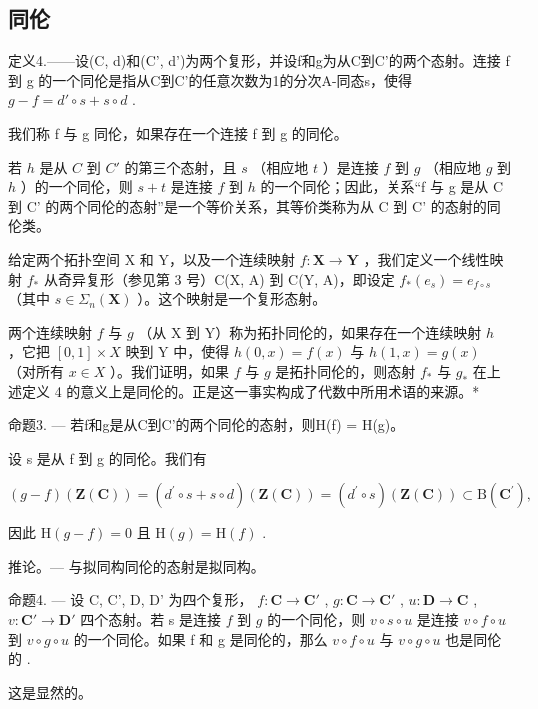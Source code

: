 \subsection{同伦}

定义4.——设(C, d)和(C', d')为两个复形，并设f和g为从C到C'的两个态射。连接 f 到 g 的一个同伦是指从C到C'的任意次数为1的分次A-同态s，使得 \(g - f = d' \circ s + s \circ d\) .

我们称 f 与 g 同伦，如果存在一个连接 f 到 g 的同伦。

若 \(h\) 是从 \(C\) 到 \(C'\) 的第三个态射，且 \(s\) （相应地 \(t\) ）是连接 \(f\) 到 \(g\) （相应地 \(g\) 到 \(h\) ）的一个同伦，则 \(s + t\) 是连接 \(f\) 到 \(h\) 的一个同伦；因此，关系“f 与 g 是从 C 到 C' 的两个同伦的态射”是一个等价关系，其等价类称为从 C 到 C' 的态射的同伦类。

给定两个拓扑空间 X 和 Y，以及一个连续映射 \(f: \mathbf{X} \to \mathbf{Y}\) ，我们定义一个线性映射 \(f_{*}\) 从奇异复形（参见第 3 号）C(X, A) 到 C(Y, A)，即设定 \(f_{*}(e_{s}) = e_{f \circ s}\) （其中 \(s \in \Sigma_{n}(\mathbf{X})\) ）。这个映射是一个复形态射。

两个连续映射 \(f\) 与 \(g\) （从 X 到 Y）称为拓扑同伦的，如果存在一个连续映射 \(h\) ，它把 \([0, 1] \times X\) 映到 Y 中，使得 \(h(0, x) = f(x)\) 与 \(h(1, x) = g(x)\) （对所有 \(x \in X\) ）。我们证明，如果 \(f\) 与 \(g\) 是拓扑同伦的，则态射 \(f_*\) 与 \(g_*\) 在上述定义 4 的意义上是同伦的。正是这一事实构成了代数中所用术语的来源。*

命题3. --- 若f和g是从C到C'的两个同伦的态射，则H(f) = H(g)。

设 s 是从 f 到 g 的同伦。我们有

\[
(g - f) (\mathbf {Z} (\mathbf {C})) = (d ^ {\prime} \circ s + s \circ d) (\mathbf {Z} (\mathbf {C})) = (d ^ {\prime} \circ s) (\mathbf {Z} (\mathbf {C})) \subset \mathrm{B} (\mathbf {C} ^ {\prime}),
\]

因此 \(\mathrm{H}(g - f) = 0\) 且 \(\mathrm{H}(g) = \mathrm{H}(f)\) .

推论。--- 与拟同构同伦的态射是拟同构。

命题4. --- 设 C, C', D, D' 为四个复形， \(f: \mathbf{C} \to \mathbf{C}'\) , \(g: \mathbf{C} \to \mathbf{C}'\) , \(u: \mathbf{D} \to \mathbf{C}\) , \(v: \mathbf{C}' \to \mathbf{D}'\) 四个态射。若 s 是连接 \(f\) 到 \(g\) 的一个同伦，则 \(v \circ s \circ u\) 是连接 \(v \circ f \circ u\) 到 \(v \circ g \circ u\) 的一个同伦。如果 f 和 g 是同伦的，那么 \(v \circ f \circ u\) 与 \(v \circ g \circ u\) 也是同伦的 .

这是显然的。

